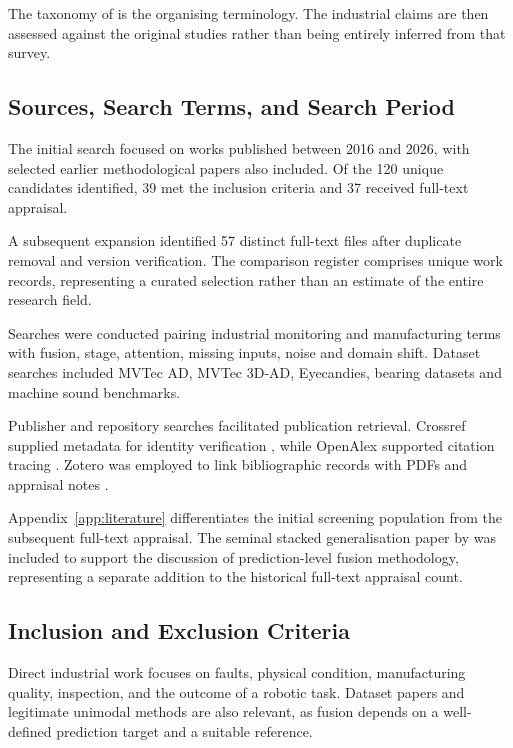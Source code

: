 The taxonomy of \textcite{Baltrusaitis2019Multimodal} is the organising terminology. The industrial claims are then assessed against the original
studies rather than being entirely inferred from that survey.

\subsection{Sources, Search Terms, and Search Period}

The initial search focused on works published between 2016 and 2026, with selected earlier
methodological papers also included. Of the 120 unique candidates identified, 39 met the
inclusion criteria and 37 received full-text appraisal.

A subsequent expansion identified 57 distinct full-text files after duplicate removal and version
verification. The comparison register comprises \ReviewWorkCount{} unique work records, representing a curated
selection rather than an estimate of the entire research field.

Searches were conducted pairing industrial monitoring and manufacturing terms with fusion, stage,
attention, missing inputs, noise and domain shift. Dataset searches included MVTec AD, MVTec 3D-AD,
Eyecandies, bearing datasets and machine sound benchmarks.

Publisher and repository searches facilitated publication retrieval. Crossref supplied metadata for
identity verification \parencite{Crossref2020REST}, while OpenAlex supported citation tracing
\parencite{Priem2022OpenAlex}. Zotero was employed to link bibliographic records with PDFs and appraisal
notes \parencite{Zotero2026}.

Appendix~\ref{app:literature} differentiates the initial screening population from the subsequent
full-text appraisal. The seminal stacked generalisation paper by \textcite{Ting1999Issues} was included
to support the discussion of prediction-level fusion methodology,
representing a separate addition to the historical full-text appraisal count.

\subsection{Inclusion and Exclusion Criteria}

Direct industrial work focuses on faults, physical condition, manufacturing quality, inspection, and
the outcome of a robotic task. Dataset papers and legitimate unimodal methods are also relevant, as
fusion depends on a well-defined prediction target and a suitable reference.

